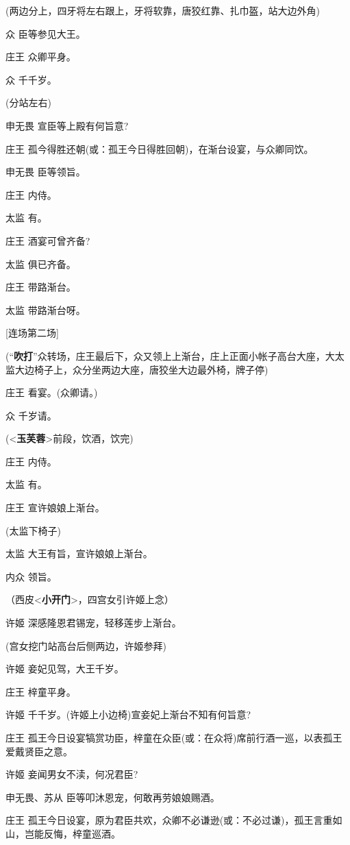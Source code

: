 (两边分上，四牙将左右跟上，牙将软靠，唐狡红靠、扎巾盔，站大边外角)

众 臣等参见大王。

庄王 众卿平身。

众 千千岁。

(分站左右)

申无畏 宣臣等上殿有何旨意?

庄王 孤今得胜还朝(或：孤王今日得胜回朝)，在渐台设宴，与众卿同饮。

申无畏 臣等领旨。

庄王 内侍。

太监 有。

庄王 酒宴可曾齐备?

太监 俱已齐备。

庄王 带路渐台。

太监 带路渐台呀。

{[}连场第二场{]}

(``\textbf{吹打}''众转场，庄王最后下，众又领上上渐台，庄上正面小帐子高台大座，大太监大边椅子上，众分坐两边大座，唐狡坐大边最外椅，牌子停)

庄王 看宴。(众卿请。)

众 千岁请。

(\textless{}\textbf{玉芙蓉}\textgreater{}前段，饮酒，饮完)

庄王 内侍。

太监 有。

庄王 宣许娘娘上渐台。

(太监下椅子)

太监 大王有旨，宣许娘娘上渐台。

内众 领旨。

（西皮\textless{}\textbf{小开门}\textgreater{}，四宫女引许姬上念）

许姬 深感隆恩君锡宠，轻移莲步上渐台。

(宫女挖门站高台后侧两边，许姬参拜)

许姬 妾妃见驾，大王千岁。

庄王 梓童平身。

许姬 千千岁。(许姬上小边椅)宣妾妃上渐台不知有何旨意?

庄王
孤王今日设宴犒赏功臣，梓童在众臣(或：在众将)席前行酒一巡，以表孤王爱戴贤臣之意。

许姬 妾闻男女不渎，何况君臣?

申无畏、苏从 臣等叩沐恩宠，何敢再劳娘娘赐酒。

庄王
孤王今日设宴，原为君臣共欢，众卿不必谦逊(或：不必过谦)，孤王言重如山，岂能反悔，梓童巡酒。

